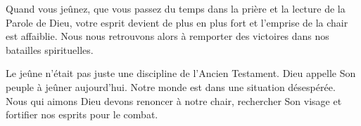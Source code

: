 Quand vous jeûnez, que vous passez du temps dans la prière
 et la lecture de la Parole de Dieu, votre esprit devient de plus en plus
 fort et l'emprise de la chair est affaiblie. Nous nous retrouvons alors
 à remporter des victoires dans nos batailles spirituelles. 

Le jeûne n'était pas juste une discipline de l'Ancien Testament.
 Dieu appelle Son peuple à jeûner aujourd'hui.
 Notre monde est dans une situation désespérée.
 Nous qui aimons Dieu devons renoncer à notre chair,
 rechercher Son visage et fortifier nos esprits pour le combat. 

\dvrule


